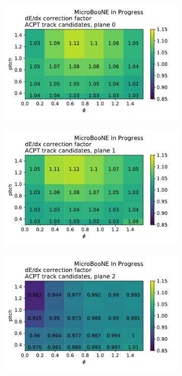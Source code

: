 \begin{figure}[H] 
\begin{center}
    \begin{subfigure}[b]{0.30\textwidth}
    \centering
    \includegraphics[width=1.00\textwidth]{recalibration/calibration_table_plane_0.pdf}
    \end{subfigure}
    \begin{subfigure}[b]{0.30\textwidth}
    \centering
    \includegraphics[width=1.00\textwidth]{recalibration/calibration_table_plane_1.pdf}
    \end{subfigure}
    \begin{subfigure}[b]{0.30\textwidth}
    \centering
    \includegraphics[width=1.00\textwidth]{recalibration/calibration_table_plane_2.pdf}

\end{subfigure}
\end{center}
\end{figure}
